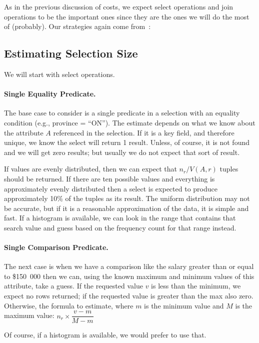 \documentclass[a4paper]{report}
\begin{document}
As in the previous discussion of costs, we expect select operations and join operations to be the important ones since they are the ones we will do the most of (probably). Our strategies again come from~\cite{dsc}: 

\subsection*{Estimating Selection Size}

We will start with select operations.


\paragraph{Single Equality Predicate.} The base case to consider is a single predicate in a selection with an equality condition (e.g., province = ``ON''). The estimate depends on what we know about the attribute $A$ referenced in the selection. If it is a key field, and therefore unique, we know the select will return 1 result. Unless, of course, it is not found and we will get zero results; but usually we do not expect that sort of result. 

If values are evenly distributed, then we can expect that $n_{r}/V(A, r)$ tuples should be returned. If there are ten possible values and everything is approximately evenly distributed then a select is expected to produce approximately 10\% of the tuples as its result. The uniform distribution may not be accurate, but if it is a reasonable approximation of the data, it is simple and fast. If a histogram is available, we can look in the range that contains that search value and guess based on the frequency count for that range instead.

\paragraph{Single Comparison Predicate.} 
The next case is when we have a comparison like the salary greater than or equal to \$150~000 then we can, using the known maximum and minimum values of this attribute, take a guess. If the requested value $v$ is less than the minimum, we expect no rows returned; if the requested value is greater than the max also zero. Otherwise, the formula to estimate, where $m$ is the minimum value and $M$ is the maximum value: $n_{r} \times \dfrac{v - m}{M - m}$

Of course, if a histogram is available, we would prefer to use that. 
\end{document}
